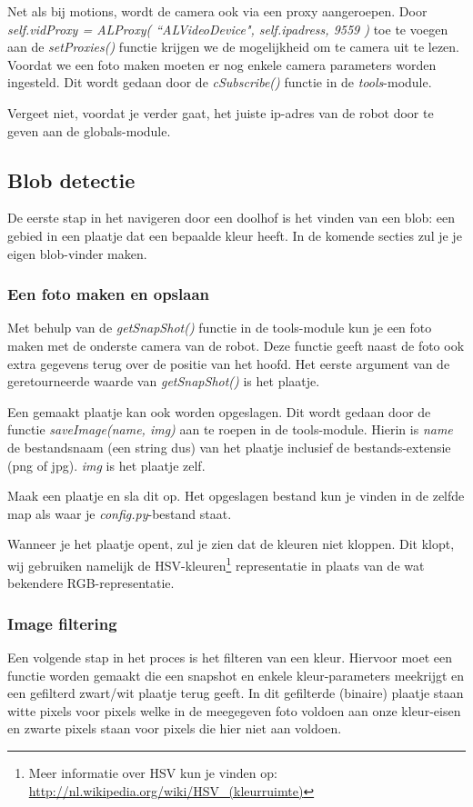 \documentclass[a4paper]{article}
\begin{document}
Net als bij motions, wordt de camera ook via een proxy aangeroepen. Door \textit{self.vidProxy = ALProxy( ``ALVideoDevice", self.ipadress, 9559 )} toe te voegen aan de \textit{setProxies()} functie krijgen we de mogelijkheid om te camera uit te lezen. Voordat we een foto maken moeten er nog enkele camera parameters worden ingesteld. Dit wordt gedaan door de \textit{cSubscribe()} functie in de \textit{tools}-module.

Vergeet niet, voordat je verder gaat, het juiste ip-adres van de robot door te geven aan de globals-module.

\subsection{Blob detectie}
De eerste stap in het navigeren door een doolhof is het vinden van een blob: een gebied in een plaatje dat een bepaalde kleur heeft. In de komende secties zul je je eigen blob-vinder maken.

\subsubsection{Een foto maken en opslaan}
Met behulp van de \textit{getSnapShot()} functie in de tools-module kun je een foto maken met de onderste camera van de robot. Deze functie geeft naast de foto ook extra gegevens terug over de positie van het hoofd. Het eerste argument van de geretourneerde waarde van \textit{getSnapShot()} is het plaatje.

Een gemaakt plaatje kan ook worden opgeslagen. Dit wordt gedaan door de functie \textit{saveImage(name, img)} aan te roepen in de tools-module. Hierin is \textit{name} de bestandsnaam (een string dus) van het plaatje inclusief de bestands-extensie (png of jpg). \textit{img} is het plaatje zelf.

Maak een plaatje en sla dit op. Het opgeslagen bestand kun je vinden in de zelfde map als waar je \textit{config.py}-bestand staat.

Wanneer je het plaatje opent, zul je zien dat de kleuren niet kloppen. Dit klopt, wij gebruiken namelijk de HSV-kleuren\footnote{Meer informatie over HSV kun je vinden op: \\ \url{http://nl.wikipedia.org/wiki/HSV_(kleurruimte)} } representatie in plaats van de wat bekendere RGB-representatie.

\subsubsection{Image filtering}
Een volgende stap in het proces is het filteren van een kleur. Hiervoor moet een functie worden gemaakt die een snapshot en enkele kleur-parameters meekrijgt en een gefilterd zwart/wit plaatje terug geeft. In dit gefilterde (binaire) plaatje staan witte pixels voor pixels welke in de meegegeven foto voldoen aan onze kleur-eisen en zwarte pixels staan voor pixels die hier niet aan voldoen.
\end{document}
